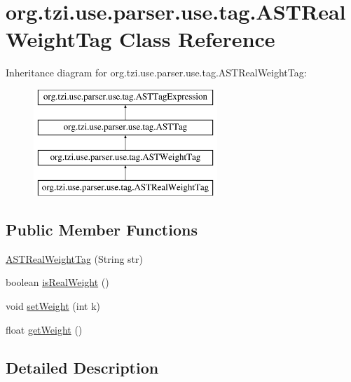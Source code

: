 \hypertarget{classorg_1_1tzi_1_1use_1_1parser_1_1use_1_1tag_1_1_a_s_t_real_weight_tag}{\section{org.\-tzi.\-use.\-parser.\-use.\-tag.\-A\-S\-T\-Real\-Weight\-Tag Class Reference}
\label{classorg_1_1tzi_1_1use_1_1parser_1_1use_1_1tag_1_1_a_s_t_real_weight_tag}
}
Inheritance diagram for org.\-tzi.\-use.\-parser.\-use.\-tag.\-A\-S\-T\-Real\-Weight\-Tag\-:\begin{figure}[H]
\begin{center}
\leavevmode
\includegraphics[height=4.000000cm]{classorg_1_1tzi_1_1use_1_1parser_1_1use_1_1tag_1_1_a_s_t_real_weight_tag}
\end{center}
\end{figure}
\subsection*{Public Member Functions}
\begin{DoxyCompactItemize}
\item 
\hyperlink{classorg_1_1tzi_1_1use_1_1parser_1_1use_1_1tag_1_1_a_s_t_real_weight_tag_ade0e9556537b21f29d8a79958f6ef9f3}{A\-S\-T\-Real\-Weight\-Tag} (String str)
\item 
boolean \hyperlink{classorg_1_1tzi_1_1use_1_1parser_1_1use_1_1tag_1_1_a_s_t_real_weight_tag_a1e13abb1ba0db5e6de8efbebe142fb23}{is\-Real\-Weight} ()
\item 
void \hyperlink{classorg_1_1tzi_1_1use_1_1parser_1_1use_1_1tag_1_1_a_s_t_real_weight_tag_abd70ef3ca56f6399a3ba79780780af0d}{set\-Weight} (int k)
\item 
float \hyperlink{classorg_1_1tzi_1_1use_1_1parser_1_1use_1_1tag_1_1_a_s_t_real_weight_tag_ab569e53d9fe480079c171af3e80c0421}{get\-Weight} ()
\end{DoxyCompactItemize}


\subsection{Detailed Description}


